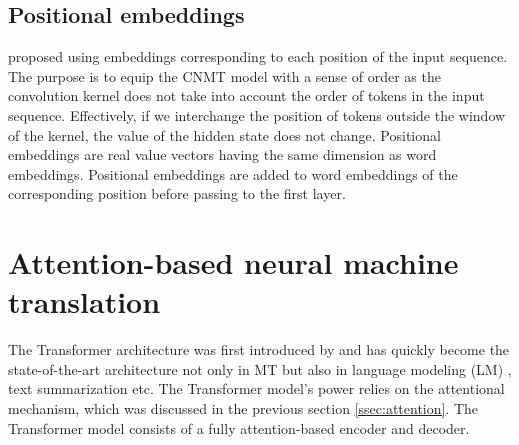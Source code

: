 \subsection{Positional embeddings}
\citet{Ghering17convolutional} proposed using embeddings corresponding to each position of the input sequence. The purpose is to equip the CNMT model with a sense of order as the convolution kernel does not take into account the order of tokens in the input sequence. Effectively, if we interchange the position of tokens outside the window of the kernel, the value of the hidden state does not change. Positional embeddings are real value vectors having the same dimension as word embeddings. Positional embeddings are added to word embeddings of the corresponding position before passing to the first layer.

\section{Attention-based neural machine translation} \label{sec:transformer}
The Transformer architecture was first introduced by \citet{Vaswani17attention} and has quickly become the state-of-the-art architecture not only in MT but also in language modeling (LM)  \citep{Devlin19bert,Conneau19cross,Brown20language}, text summarization \citep{Zhang20pegasus} etc. The Transformer model's power relies on the attentional mechanism, which was discussed in the previous section \ref{ssec:attention}. The Transformer model consists of a fully attention-based encoder and decoder. 
